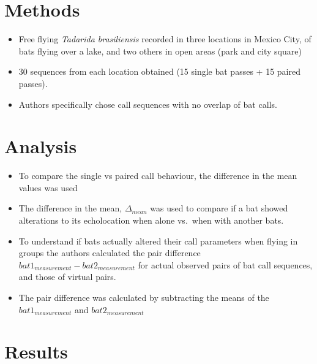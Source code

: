 \documentclass[
]{book}
\providecommand{\tightlist}{%
  \setlength{\itemsep}{0pt}\setlength{\parskip}{0pt}}
\begin{document}
\hypertarget{methods}{%
\section{Methods}\label{methods}}

\begin{itemize}
\tightlist
\item
  Free flying \emph{Tadarida brasiliensis} recorded in three locations in Mexico City, of bats flying over a lake, and two others in open areas (park and city square)
\item
  30 sequences from each location obtained (15 single bat passes + 15 paired passes).
\item
  Authors specifically chose call sequences with no overlap of bat calls.
\end{itemize}

\hypertarget{analysis}{%
\section{Analysis}\label{analysis}}

\begin{itemize}
\tightlist
\item
  To compare the single vs paired call behaviour, the difference in the mean values was used
\item
  The difference in the mean, \(\Delta_{mean}\) was used to compare if a bat showed alterations to its echolocation when alone vs.~when with another bats.
\item
  To understand if bats actually altered their call parameters when flying in groups the authors calculated the pair difference \(bat1_{measurement}-bat2_{measurement}\) for actual observed pairs of bat call sequences, and those of virtual pairs.
\item
  The pair difference was calculated by subtracting the means of the \(bat1_{measurement}\) and \(bat2_{measurement}\)
\end{itemize}

\hypertarget{results}{%
\section{Results}\label{results}}
\end{document}
